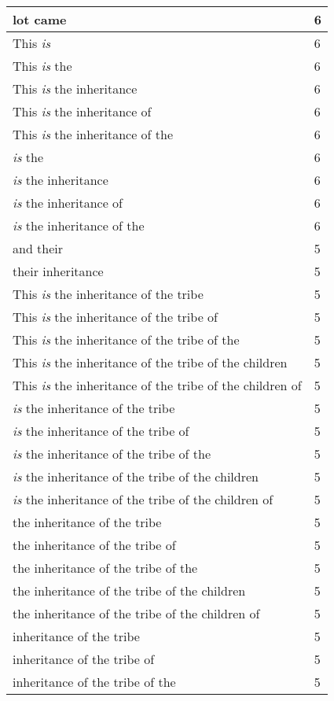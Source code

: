 \begin{center}
\begin{longtable}{|p{3.0in}|p{0.5in}|}
lot came & 6\\ \hline 
This \emph{is} & 6\\ \hline 
This \emph{is} the & 6\\ \hline 
This \emph{is} the inheritance & 6\\ \hline 
This \emph{is} the inheritance of & 6\\ \hline 
This \emph{is} the inheritance of the & 6\\ \hline 
\emph{is} the & 6\\ \hline 
\emph{is} the inheritance & 6\\ \hline 
\emph{is} the inheritance of & 6\\ \hline 
\emph{is} the inheritance of the & 6\\ \hline 
and their & 5\\ \hline 
their inheritance & 5\\ \hline 
This \emph{is} the inheritance of the tribe & 5\\ \hline 
This \emph{is} the inheritance of the tribe of & 5\\ \hline 
This \emph{is} the inheritance of the tribe of the & 5\\ \hline 
This \emph{is} the inheritance of the tribe of the children & 5\\ \hline 
This \emph{is} the inheritance of the tribe of the children of & 5\\ \hline 
\emph{is} the inheritance of the tribe & 5\\ \hline 
\emph{is} the inheritance of the tribe of & 5\\ \hline 
\emph{is} the inheritance of the tribe of the & 5\\ \hline 
\emph{is} the inheritance of the tribe of the children & 5\\ \hline 
\emph{is} the inheritance of the tribe of the children of & 5\\ \hline 
the inheritance of the tribe & 5\\ \hline 
the inheritance of the tribe of & 5\\ \hline 
the inheritance of the tribe of the & 5\\ \hline 
the inheritance of the tribe of the children & 5\\ \hline 
the inheritance of the tribe of the children of & 5\\ \hline 
inheritance of the tribe & 5\\ \hline 
inheritance of the tribe of & 5\\ \hline 
inheritance of the tribe of the & 5\\ \hline 

\end{longtable}
\end{center}
